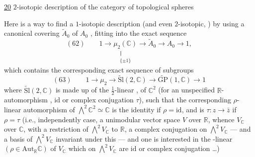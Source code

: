 \uline{20} $2$-isotopic description of the category of topological spheres

Here is a way to find a
$1$-isotopic description (and even $2$-isotopic, )
by using a canonical covering 
$\widetilde A_0$ of $A_0$ , fitting into the exact sequence
\[
(62)\qquad
1\longrightarrow\underset{\substack{\Vert\\\{\pm1\}}}{\mu_2(\mathbb C)}
\longrightarrow\widetilde A_0\longrightarrow A_0\longrightarrow1,
\]
which contains the  corresponding exact sequence
of subgroups
\[
(63)\qquad
1\longrightarrow\mu_2\longrightarrow\widetilde{\mathrm{Sl}}(2,\mathbb C)
\longrightarrow\widetilde{\mathrm{GP}}(1,\mathbb C)\longrightarrow1
\]
where $\widetilde{\mathrm{Sl}}(2,\mathbb C)$ is made up of the $\frac12$-linear ,
of $\mathbb C^2$ (for an unspecified $\mathbb R$-automorphism \inserted{$\rho$},
$\mathrm{id}$ or complex conjugation $\tau$), such that the corresponding
$\rho$-linear automorphism of $\bigwedge^2\mathbb C^2\simeq\mathbb C$
is the identity if $\rho=\mathrm{id}$, and is $\tau:z\longrightarrow\bar z$
if $\rho=\tau$ (i.e., independently  case, 
a unimodular vector space $V$ over $\mathbb R$, whence
$V_{\mathbb C}$ over $\mathbb C$, with a restriction of $\bigwedge^2 V_{\mathbb C}$ to $\mathbb R$,
 a complex conjugation on $\bigwedge^2 V_{\mathbb C}$
--- and a  basis of $\bigwedge^2 V_{\mathbb C}$ invariant under
this --- and one is interested in the
-linear $(\rho\in\mathrm{Aut}_{\mathbb R}\mathbb C)$  of $V_{\mathbb C}$ which on
$\bigwedge^2 V_{\mathbb C}$ are $\mathrm{id}$ or complex conjugation \ldots)

